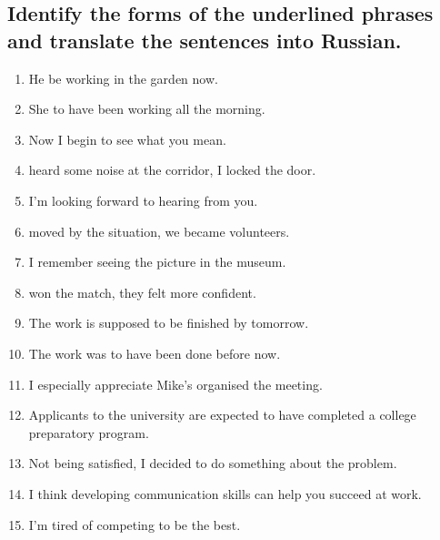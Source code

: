 \subsection*{Identify the forms of the underlined phrases and translate the sentences into Russian.}
\begin{enumerate}
      \item He \underline{\hspace{2cm}} be working in the garden now.
      \item She \underline{\hspace{2cm}} to have been working all the morning.
      \item Now I begin to see what you mean.
      \item \underline{\hspace{2cm}} heard some noise at the corridor, I locked the door.
      \item I’m looking forward to hearing from you.
      \item \underline{\hspace{2cm}} moved by the situation, we became volunteers.
      \item I remember seeing the picture in the museum.
      \item \underline{\hspace{2cm}} won the match, they felt more confident.
      \item The work is supposed to be finished by tomorrow.
      \item The work was to have been done before now.
      \item I especially appreciate Mike's \underline{\hspace{2cm}} organised the meeting.
      \item Applicants to the university are expected to have completed a college preparatory program.
      \item Not being satisfied, I decided to do something about the problem.
      \item I think developing communication skills can help you succeed at work.
      \item I’m tired of competing to be the best.
\end{enumerate}


